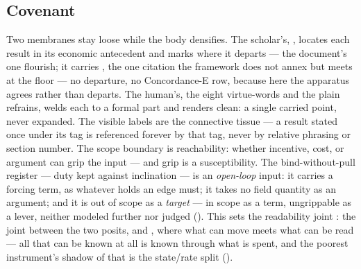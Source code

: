\documentclass[../main]{subfiles}
\begin{document}
\subsection{Covenant}
\label{subsec:gen:covenant}
%
Two membranes stay loose while the body densifies. The scholar's, \registername{[econ]}, locates
each result in its economic antecedent and marks where it departs --- the document's one
flourish; it carries , the one citation the framework does not annex but
meets at the floor --- no departure, no Concordance-E row, because here the apparatus agrees
rather than departs. The human's, the eight virtue-words and the plain refrains, welds each
to a formal part and renders clean: a single carried point, never expanded. The visible
labels are the connective tissue --- a result stated once under its tag is referenced
forever by that tag, never by relative phrasing or section number. The scope boundary is
reachability: whether incentive, cost, or argument can grip the input --- and grip is a
susceptibility. The bind-without-pull register --- duty kept against inclination --- is
an \emph{open-loop} input: it carries a forcing term, as whatever holds an edge must;
it takes no field quantity as an argument; and it is out of scope as a \emph{target} ---
in scope as a term, ungrippable as a lever, neither modeled further nor judged
(). This sets the
readability joint : the joint between the two posits,  and
, where what can move meets what can be read --- all that can be known at
all is known through what is spent, and the poorest instrument's shadow of that is the
state/rate split ().
\end{document}
